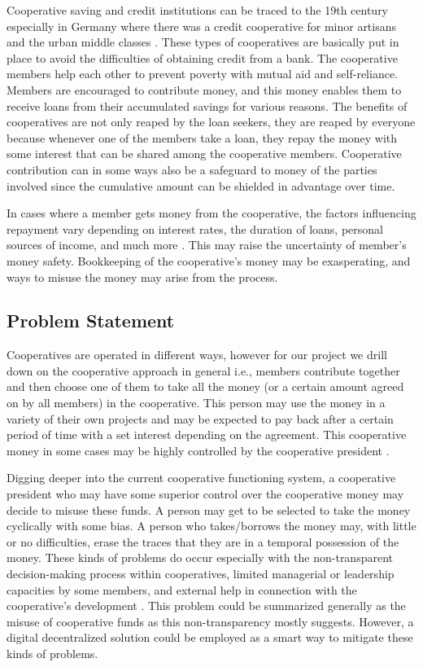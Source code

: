 \documentclass{article}
\begin{document}
Cooperative saving and credit institutions can be traced to the 19th century especially in Germany where there was a credit cooperative for minor artisans and the urban middle classes \cite{galor2018saving}. These types of cooperatives are basically put in place to avoid the difficulties of obtaining credit from a bank. The cooperative members help each other to prevent poverty with mutual aid and self-reliance. Members are encouraged to contribute money, and this money enables them to receive loans from their accumulated savings for various reasons. The benefits of cooperatives are not only reaped by the loan seekers, they are reaped by everyone because whenever one of the members take a loan, they repay the money with some interest that can be shared among the cooperative members. Cooperative contribution can in some ways also be a safeguard to money of the parties involved since the cumulative amount can be shielded in advantage over time. \cite{galor2018saving}

In cases where a member gets money from the cooperative, the factors influencing repayment vary depending on interest rates, the duration of loans, personal sources of income, and much more \cite{papias2009repayment}. This may raise the uncertainty of member’s money safety. Bookkeeping of the cooperative’s money may be exasperating, and ways to misuse the money may arise from the process.

\subsection{Problem Statement}
Cooperatives are operated in different ways, however for our project we drill down on the cooperative approach in general i.e., members contribute together and then choose one of them to take all the money (or a certain amount agreed on by all members) in the cooperative. This person may use the money in a variety of their own projects and may be expected to pay back after a certain period of time with a set interest depending on the agreement. This cooperative money in some cases may be highly controlled by the cooperative president \cite{nilsson2013cooperative}.

Digging deeper into the current cooperative functioning system, a cooperative president who may have some superior control over the cooperative money may decide to misuse these funds. A person may get to be selected to take the money cyclically with some bias. A person who takes/borrows the money may, with little or no difficulties, erase the traces that they are in a temporal possession of the money. These kinds of problems do occur especially with the non-transparent decision-making process within cooperatives, limited managerial or leadership capacities by some members, and external help in connection with the cooperative's development \cite{rca001}. This problem could be summarized generally as the misuse of cooperative funds as this non-transparency mostly suggests. However, a digital decentralized solution could be employed as a smart way to mitigate these kinds of problems.
\end{document}
